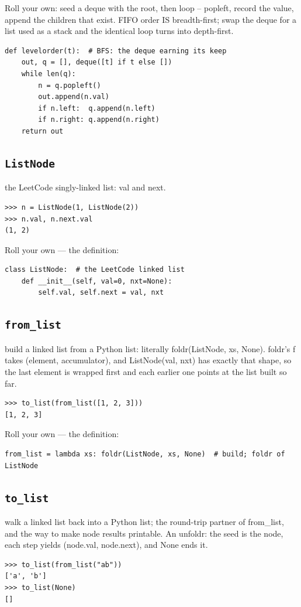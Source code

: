 \documentclass[10pt,letterpaper]{book}
\begin{document}
Roll your own: seed a deque with the root, then loop -- popleft, record the value, append the children that exist. FIFO order IS breadth-first; swap the deque for a list used as a stack and the identical loop turns into depth-first.

\begin{lstlisting}[style=ex]
def levelorder(t):  # BFS: the deque earning its keep
    out, q = [], deque([t] if t else [])
    while len(q):
        n = q.popleft()
        out.append(n.val)
        if n.left:  q.append(n.left)
        if n.right: q.append(n.right)
    return out
\end{lstlisting}
\subsection{\texttt{ListNode}}\label{def:ListNode}
the LeetCode singly-linked list: val and next.
\begin{lstlisting}[style=ex]
>>> n = ListNode(1, ListNode(2))
>>> n.val, n.next.val
(1, 2)
\end{lstlisting}

Roll your own --- the definition:

\begin{lstlisting}[style=ex]
class ListNode:  # the LeetCode linked list
    def __init__(self, val=0, nxt=None):
        self.val, self.next = val, nxt
\end{lstlisting}
\subsection{\texttt{from\_list}}\label{def:from-list}
build a linked list from a Python list: literally foldr(ListNode, xs, None). foldr's f takes (element, accumulator), and ListNode(val, nxt) has exactly that shape, so the last element is wrapped first and each earlier one points at the list built so far.
\begin{lstlisting}[style=ex]
>>> to_list(from_list([1, 2, 3]))
[1, 2, 3]
\end{lstlisting}

Roll your own --- the definition:

\begin{lstlisting}[style=ex]
from_list = lambda xs: foldr(ListNode, xs, None)  # build; foldr of ListNode
\end{lstlisting}

\subsection{\texttt{to\_list}}\label{def:to-list}
walk a linked list back into a Python list; the round-trip partner of from\_list, and the way to make node results printable. An unfoldr: the seed is the node, each step yields (node.val, node.next), and None ends it.
\begin{lstlisting}[style=ex]
>>> to_list(from_list("ab"))
['a', 'b']
>>> to_list(None)
[]
\end{lstlisting}
\end{document}
